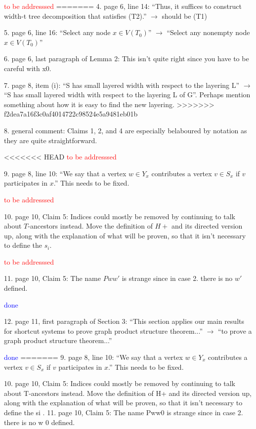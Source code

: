\documentclass[12pt]{article}
\newcommand{\done}{\textcolor{blue}{done}}
\newcommand{\tba}{\textcolor{red}{to be addresssed}}
\begin{document}
\tba
=======
4. page 6, line 14: “Thus, it suffices to construct width-t tree decomposition that satisfies (T2).” $\longrightarrow$ should be (T1)

5. page 6, line 16: “Select any node $x \in V (T_0)$” $\longrightarrow$ “Select any nonempty node $x \in V (T_0)$”

6. page 6, last paragraph of Lemma 2: This isn’t quite right since you
have to be careful with x0.

7. page 8, item (i): “S has small layered width with respect to the layering
L” $\longrightarrow$ “S has small layered width with respect to the layering L of
G”. Perhaps mention something about how it is easy to find the new
layering.
>>>>>>> f2dea7a16f3c0af4014722c98524e5a9481eb01b

8. general comment: Claims 1, 2, and 4 are especially belaboured by
notation as they are quite straightforward.

<<<<<<< HEAD
\tba

9. page 8, line 10: ``We say that a vertex $w \in Y_x$ contributes a vertex
$v \in S_x$ if $v$ participates in $x$.'' This needs to be fixed.

\tba

10. page 10, Claim 5: Indices could mostly be removed by continuing
to talk about $T$-ancestors instead. Move the definition of $H+$ and its
directed version up, along with the explanation of what will be proven,
so that it isn’t necessary to define the $s_i$.

\tba

11. page 10, Claim 5: The name $Pww'$ is strange since in case 2. there is
no $w'$ defined.

\done

12. page 11, first paragraph of Section 3: ``This section applies our main results for shortcut systems to prove graph product structure theorem...'' $\longrightarrow$ ``to prove a graph product structure theorem...''

\done
=======
9. page 8, line 10: “We say that a vertex $w \in Y_x$ contributes a vertex
$v \in S_x$ if $v$ participates in $x$.” This needs to be fixed.

10. page 10, Claim 5: Indices could mostly be removed by continuing
to talk about T-ancestors instead. Move the definition of H+ and its
directed version up, along with the explanation of what will be proven,
so that it isn’t necessary to define the si
.
11. page 10, Claim 5: The name Pww0 is strange since in case 2. there is
no w 0 defined.
\end{document}
